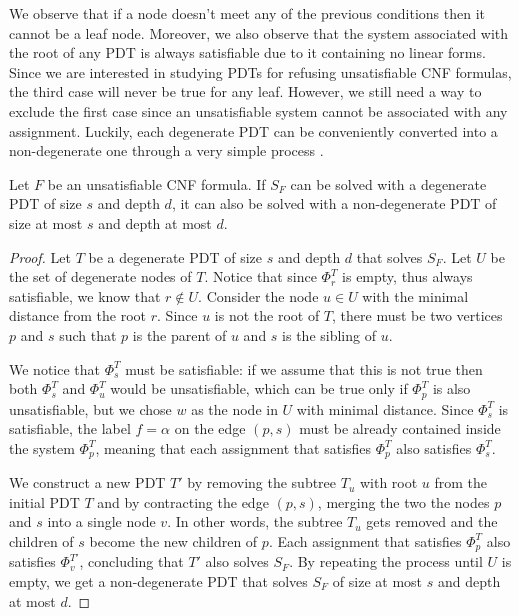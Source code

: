 We observe that if a node doesn't meet any of the previous conditions then it cannot be a leaf node. Moreover, we also observe that the system associated with the root of any PDT is always satisfiable due to it containing no linear forms. Since we are interested in studying PDTs for refusing unsatisfiable CNF formulas, the third case will never be true for any leaf. However, we still need a way to exclude the first case since an unsatisfiable system cannot be associated with any assignment. Luckily, each degenerate PDT can be conveniently converted into a non-degenerate one through a very simple process \cite{res_lin_2}.

\begin{proposition}
    \label{degenerate}
    Let $F$ be an unsatisfiable CNF formula. If $S_F$ can be solved with a degenerate PDT of size $s$ and depth $d$, it can also be solved with a non-degenerate PDT of size at most $s$ and depth at most $d$.
\end{proposition}

\begin{proof}
    
    Let $T$ be a degenerate PDT of size $s$ and depth $d$ that solves $S_F$. Let $U$ be the set of degenerate nodes of $T$. Notice that since $\Phi_r^T$ is empty, thus always satisfiable, we know that $r \notin U$. Consider the node $u \in U$ with the minimal distance from the root $r$. Since $u$ is not the root of $T$, there must be two vertices $p$ and $s$ such that $p$ is the parent of $u$ and $s$ is the sibling of $u$.

    We notice that $\Phi_s^T$ must be satisfiable: if we assume that this is not true then both $\Phi_s^T$ and $\Phi_u^T$ would be unsatisfiable, which can be true only if $\Phi_p^T$ is also unsatisfiable, but we chose $w$ as the node in $U$ with minimal distance. Since $\Phi_s^T$ is satisfiable, the label $f = \alpha$ on the edge $(p,s)$ must be already contained inside the system $\Phi_p^T$, meaning that each assignment that satisfies $\Phi_p^T$ also satisfies $\Phi_s^T$.

    We construct a new PDT $T'$ by removing the subtree $T_u$ with root $u$ from the initial PDT $T$ and by contracting the edge $(p,s)$, merging the two the nodes $p$ and $s$ into a single node $v$. In other words, the subtree $T_u$ gets removed and the children of $s$ become the new children of $p$. Each assignment that satisfies $\Phi_p^T$ also satisfies $\Phi_v^{T'}$, concluding that $T'$ also solves $S_F$. By repeating the process until $U$ is empty, we get a non-degenerate PDT that solves $S_F$ of size at most $s$ and depth at most $d$.
\end{proof}

